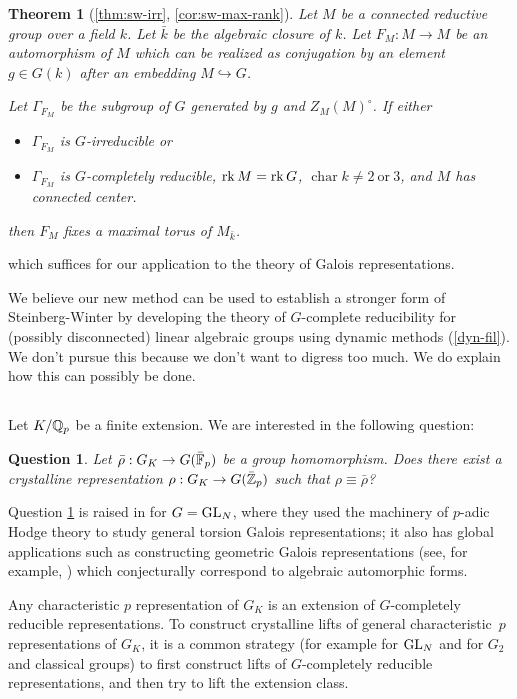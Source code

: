 \documentclass[10pt,a4paper,twoside]{article}
\newtheorem{thm}{Theorem}
\newtheorem{quest}{Question}
\begin{document}
\begin{thm} [\ref{thm:sw-irr}, \ref{cor:sw-max-rank}]
Let $M$ be a connected reductive group over a field $k$.
Let $\bar k$ be the algebraic closure of $k$.
Let $F_M : M\to M$ be an automorphism of $M$ which can be realized
as conjugation by an element $g\in G(k)$ after an embedding
$M \hookrightarrow G$.

Let $\Gamma_{F_M}$ be the subgroup of $G$ generated by $g$ and $Z_M(M)^\circ$.
If either
\begin{itemize}
\item $\Gamma_{F_M}$ is $G$-irreducible or
\item $\Gamma_{F_M}$ is $G$-completely reducible, $\operatorname{rk} M = \operatorname{rk} G$, $\operatorname{char} k \ne 2~\text{or}~3$, and $M$ has connected center.
\end{itemize}
then $F_M$ fixes a maximal torus of $M_{\bar k}$.
\end{thm}
\noindent
which suffices for our application to the theory of Galois representations.

We believe our new method can be used to establish a stronger form of Steinberg-Winter by
developing the theory of $G$-complete reducibility for (possibly disconnected) linear algebraic groups
using dynamic methods (\ref{dyn-fil}).
We don't pursue this because we don't want to digress too much.
We do explain how this can possibly be done.


\subsection{}
Let $K/\mathbb{Q}_p$ be a finite extension.
We are interested in the following question:
\begin{quest}
\label{quest:lift}
Let $\bar \rho:G_K\to G(\bar{\mathbb{F}}_p)$ be a group homomorphism.
Does there exist a crystalline representation
$\rho:G_K\to G(\bar{\mathbb{Z}}_p)$ such that $\rho \equiv \bar\rho$?
\end{quest}
\noindent
Question \ref{quest:lift} is raised in \cite{CL11} for $G=\operatorname{GL}_N$,
where they used the machinery of $p$-adic Hodge theory 
to study general torsion Galois representations;
it also has global applications such as
constructing geometric Galois representations
(see, for example, \cite{FKP21}) which conjecturally
correspond to algebraic automorphic forms.


Any characteristic $p$ representation of $G_K$
is an extension of $G$-completely reducible representations.
To construct crystalline lifts of general characteristic~$p$
representations of $G_K$,
it is a common strategy (for example \cite{EG19} for $\operatorname{GL}_N$ and \cite{L21} for $G_2$ and classical groups)
to first construct
lifts of $G$-completely reducible representations, and then try to lift the extension class.
\end{document}
